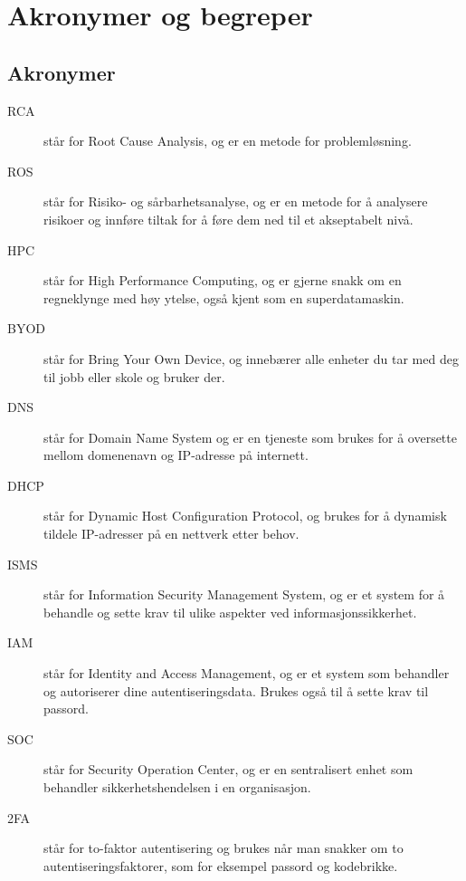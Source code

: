 \chapter*{Akronymer og begreper}
\label{kap:akronymer}

\section*{Akronymer}
\begin{description}
    \item[RCA] står for Root Cause Analysis, og er en metode for problemløsning.
    \item[ROS] står for Risiko- og sårbarhetsanalyse, og er en metode for å analysere risikoer og innføre tiltak for å føre dem ned til et akseptabelt nivå.
    \item[HPC] står for High Performance Computing, og er gjerne snakk om en regneklynge med høy ytelse, også kjent som en superdatamaskin.
    \item[BYOD] står for Bring Your Own Device, og innebærer alle enheter du tar med deg til jobb eller skole og bruker der.
    \item[DNS] står for Domain Name System og er en tjeneste som brukes for å oversette mellom domenenavn og IP-adresse på internett.
    \item[DHCP] står for Dynamic Host Configuration Protocol, og brukes for å dynamisk tildele IP-adresser på en nettverk etter behov.
    \item[ISMS] står for Information Security Management System, og er et system for å behandle og sette krav til ulike aspekter ved informasjonssikkerhet.
    \item[IAM] står for Identity and Access Management, og er et system som behandler og autoriserer dine autentiseringsdata. Brukes også til å sette krav til passord. 
    \item[SOC] står for Security Operation Center, og er en sentralisert enhet som behandler sikkerhetshendelsen i en organisasjon. 
    \item[2FA] står for to-faktor autentisering og brukes når man snakker om to autentiseringsfaktorer, som for eksempel passord og kodebrikke. 
\end{description}


